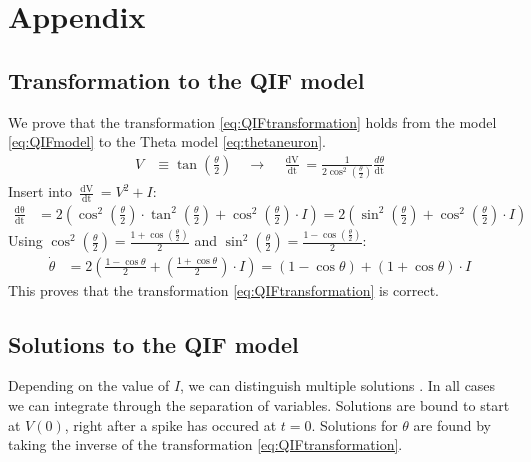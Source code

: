 
\newpage
\appendix
\section{Appendix} \label{sec:Appendix}

\subsection{Transformation to the QIF model} \label{app:TransformationToQIF}
We prove that the transformation \eqref{eq:QIFtransformation} holds from the \QIF model \eqref{eq:QIFmodel} to the Theta model \eqref{eq:thetaneuron}.
\begin{align*}
V &\equiv \tan \left( \frac{\theta}{2} \right) \quad \longrightarrow \quad
\frac{\mathop{d V}}{\mathop{d t}} = \frac{1}{2 \cos ^{2}\left(\frac{\theta}{2}\right)} \frac{d \theta}{ \mathop{d t}}
\end{align*}
Insert into $\frac{\mathop{d V}}{\mathop{d t}}= V^2 + I$:
\begin{align*}
\frac{\mathop{d \theta}}{\mathop{d t}} &= 2\left(\cos ^{2}\left(\frac{\theta}{2}\right) \cdot \tan ^{2}\left(\frac{\theta}{2}\right)+\cos ^{2}\left(\frac{\theta}{2}\right) \cdot I \right) = 2\left(\sin ^{2}\left(\frac{\theta}{2}\right)+\cos ^{2}\left(\frac{\theta}{2}\right) \cdot I \right)
\end{align*}
Using $\cos ^{2}\left(\frac{\theta}{2}\right) = \frac{1+\cos \left(\frac{\theta}{2}\right)}{2}$ and $\sin ^{2}\left(\frac{\theta}{2}\right)=\frac{1-\cos \left(\frac{\theta}{2}\right)}{2}$:
\begin{align*}
\dot{\theta} &=2\left(\frac{1-\cos \theta}{2}+\left(\frac{1+\cos \theta}{2}\right) \cdot I \right) =(1-\cos \theta)+(1+\cos \theta) \cdot I
\end{align*}
This proves that the transformation \eqref{eq:QIFtransformation} is correct.

 
\subsection{Solutions to the QIF model} \label{app:ThetaModelSolutions}
Depending on the value of $I$, we can distinguish multiple solutions  \cite{Perez2020}. In all cases we can integrate through the separation of variables. Solutions are bound to start at $V(0)$, right after a spike has occured at $t=0$. Solutions for $\theta$ are found by taking the inverse of the transformation \eqref{eq:QIFtransformation}.

